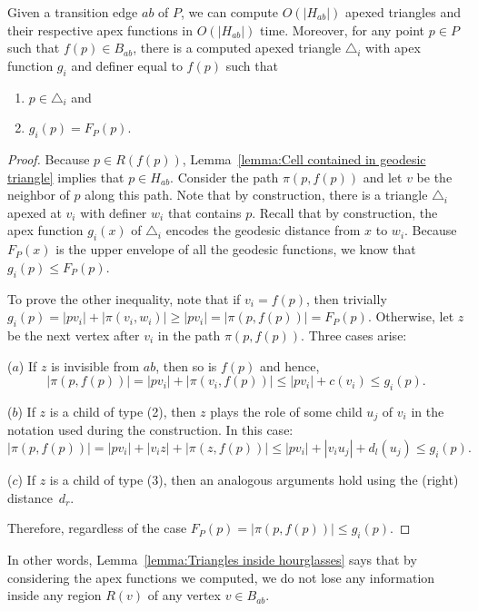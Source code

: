 \documentclass[a4paper,UKenglish]{lipics}
\newcommand{\F}[2]{\ensuremath{F_{\scriptscriptstyle #1}(#2)}}
\newcommand{\ff}[1]{\ensuremath{f(#1)}}
\newcommand{\g}[2]{\ensuremath{|\pi(#1, #2)|}}
\newcommand{\p}[2]{\ensuremath{\pi(#1, #2)}}
\begin{document}
\begin{lemma}\label{lemma:Triangles inside hourglasses}
Given a transition edge $ab$ of $P$, we can compute $O(|H_{ab}|)$ apexed triangles and their respective apex functions in $O(|H_{ab}|)$ time. 
Moreover, for any point $p\in P$ such that $\ff{p}\in B_{ab}$,
there is a computed apexed triangle $\triangle_i$ with apex function $g_i$ and definer equal to $\ff{p}$ such that
\begin{enumerate}
\item $p\in \triangle_i$ and 
\item $g_i(p) = \F{P}{p}$.
\end{enumerate}
\end{lemma}
\begin{proof}
Because $p\in R(\ff{p})$, Lemma~\ref{lemma:Cell contained in geodesic triangle} implies that $p\in H_{ab}$. 
Consider the path $\p{p}{\ff{p}}$ and let $v$ be the neighbor of $p$ along this path. 
Note that by construction, there is a triangle $\triangle_i$ apexed at $v_i$ with definer $w_i$ that contains $p$. 
Recall that by construction, the apex function $g_i(x)$ of $\triangle_i$ encodes the geodesic distance from $x$ to $w_i$. 
Because $\F{P}{x}$ is the upper envelope of all the geodesic functions, we know that $g_i(p) \leq \F{P}{p}$.

To prove the other inequality, note that if $v_i = \ff{p}$, then trivially $g_i(p) = |pv_i| + \g{v_i}{w_i} \geq |pv_i| = \g{p}{\ff{p}} = \F{P}{p}$. 
Otherwise, let $z$ be the next vertex after $v_i$ in the path $\p{p}{\ff{p}}$. Three cases arise:

($a$) If $z$ is invisible from $ab$, then so is $\ff{p}$ and hence, 
$$\g{p}{ \ff{p}} = |pv_i| + \g{v_i}{ \ff{p}} \leq |pv_i| + c(v_i) \leq g_i(p).$$

($b$) If $z$ is a child of type (2), then $z$ plays the role of some child $u_j$ of $v_i$ in the notation used during the construction.
In this case:
$$\g{p}{\ff{p}} = |pv_i| + |v_i z| + \g{z}{\ff{p}} \leq |pv_i| + |v_i u_j| + d_l(u_j) \leq g_i(p).$$

($c$) If $z$ is a child of type (3), then an analogous arguments hold using the (right) distance~$d_r$.

Therefore, regardless of the case $\F{P}{p} = \g{p}{ \ff{p}} \leq g_i(p)$.
\end{proof}

In other words, Lemma~\ref{lemma:Triangles inside hourglasses} says that by considering the apex functions we computed, we do not lose any information inside any region $R(v)$ of any vertex $v\in B_{ab}$.
\end{document}
